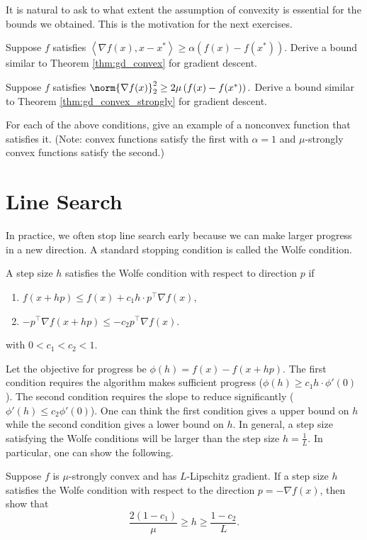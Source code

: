 It is natural to ask to what extent the assumption of convexity is
essential for the bounds we obtained. This is the motivation for the
next exercises.
\begin{xca}
Suppose $f$ satisfies $\left\langle \nabla f(x),x-x^{*}\right\rangle \ge\alpha\left(f(x)-f(x^{*})\right)$.
Derive a bound similar to Theorem \ref{thm:gd_convex} for gradient
descent.
\end{xca}

\begin{xca}
Suppose $f$ satisfies $\norm{\nabla f(x)}_{2}^{2}\ge2\mu\left(f(x)-f(x^{*})\right).$
Derive a bound similar to Theorem \ref{thm:gd_convex_strongly} for
gradient descent.
\end{xca}

\begin{xca}
For each of the above conditions, give an example of a nonconvex function
that satisfies it. (Note: convex functions satisfy the first with
$\alpha=1$ and $\mu$-strongly convex functions satisfy the second.)
\end{xca}


\section{Line Search}

In practice, we often stop line search early because we can make larger
progress in a new direction. A standard stopping condition is called
the Wolfe condition.
\begin{defn}
A step size $h$ satisfies the Wolfe condition with respect to direction
$p$ if
\begin{enumerate}
\item $f(x+hp)\leq f(x)+c_{1}h\cdot p^{\top}\nabla f(x)$,
\item $-p^{\top}\nabla f(x+hp)\leq-c_{2}p^{\top}\nabla f(x)$.
\end{enumerate}
with $0<c_{1}<c_{2}<1$.
\end{defn}

Let the objective for progress be $\phi(h)=f(x)-f(x+hp)$. The first
condition requires the algorithm makes sufficient progress ($\phi(h)\geq c_{1}h\cdot\phi'(0)$).
The second condition requires the slope to reduce significantly ($\phi'(h)\leq c_{2}\phi'(0)$).
One can think the first condition gives a upper bound on $h$ while
the second condition gives a lower bound on $h$. In general, a step
size satisfying the Wolfe conditions will be larger than the step
size $h=\frac{1}{L}$. In particular, one can show the following.
\begin{xca}
Suppose $f$ is $\mu$-strongly convex and has $L$-Lipschitz gradient.
If a step size $h$ satisfies the Wolfe condition with respect to
the direction $p=-\nabla f(x)$, then show that
\[
\frac{2(1-c_{1})}{\mu}\geq h\geq\frac{1-c_{2}}{L}.
\]
\end{xca}

